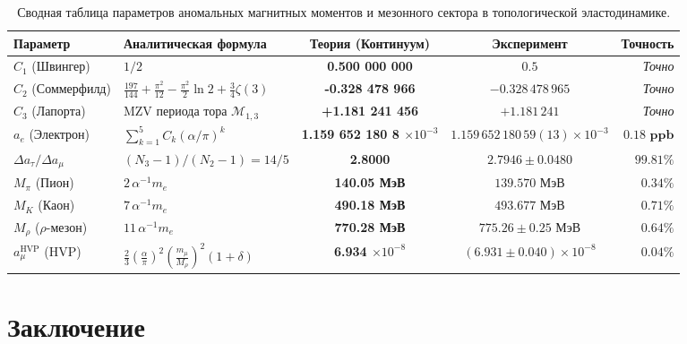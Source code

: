 \documentclass[12pt,a4paper]{article}
\begin{document}
	\begin{table}[h!]
		\centering
		\footnotesize
		\renewcommand{\arraystretch}{1.25}
		\begin{tabularx}{\textwidth}{l >{\raggedright\arraybackslash}X c c r}
			\toprule
			\textbf{Параметр} & \textbf{Аналитическая формула} & \textbf{Теория (Континуум)} & \textbf{Эксперимент} & \textbf{Точность} \\
			\midrule
			$C_1$ (Швингер) & $1/2$ & \textbf{0.500 000 000} & $0.5$ & \textit{Точно} \\
			$C_2$ (Соммерфилд) & $\frac{197}{144} + \frac{\pi^2}{12} - \frac{\pi^2}{2}\ln 2 + \frac{3}{4}\zeta(3)$ & \textbf{-0.328 478 966} & $-0.328\,478\,965$ & \textit{Точно} \\
			$C_3$ (Лапорта) & MZV периода тора $\mathcal{M}_{1,3}$ & \textbf{+1.181 241 456} & $+1.181\,241$ & \textit{Точно} \\
			$a_e$ (Электрон) & $\sum_{k=1}^5 C_k (\alpha/\pi)^k$ & \textbf{1.159 652 180 8 $\times 10^{-3}$} & $1.159\,652\,180\,59(13) \times 10^{-3}$ & $\mathbf{0.18 \text{ ppb}}$ \\
			$\Delta a_\tau / \Delta a_\mu$ & $(N_3 - 1)/(N_2 - 1) = 14/5$ & \textbf{2.8000} & $2.7946 \pm 0.0480$ & $\mathbf{99.81\%}$ \\
			\midrule
			$M_\pi$ (Пион) & $2 \, \alpha^{-1} m_e$ & \textbf{140.05 МэВ} & $139.570$ МэВ & $\mathbf{0.34\%}$ \\
			$M_K$ (Каон) & $7 \, \alpha^{-1} m_e$ & \textbf{490.18 МэВ} & $493.677$ МэВ & $\mathbf{0.71\%}$ \\
			$M_\rho$ ($\rho$-мезон) & $11 \, \alpha^{-1} m_e$ & \textbf{770.28 МэВ} & $775.26 \pm 0.25$ МэВ & $\mathbf{0.64\%}$ \\
			$a_\mu^{\text{HVP}}$ (HVP) & $\frac{2}{3}(\frac{\alpha}{\pi})^2 (\frac{m_\mu}{M_\rho})^2 (1+\delta)$ & \textbf{6.934 $\times 10^{-8}$} & $(6.931 \pm 0.040) \times 10^{-8}$ & $\mathbf{0.04\%}$ \\
			\bottomrule
		\end{tabularx}
		\caption{Сводная таблица параметров аномальных магнитных моментов и мезонного сектора в топологической эластодинамике.}
		\label{tab:g2_summary}
	\end{table}
	
	\section{Заключение}
	
\end{document}
